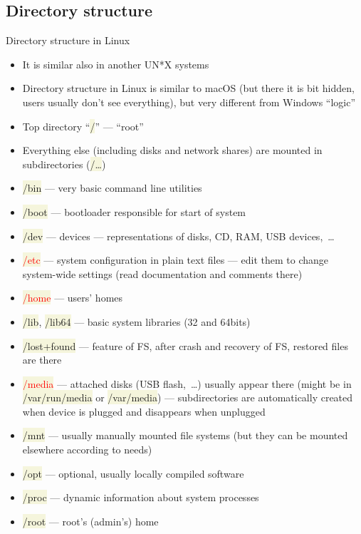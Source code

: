 \documentclass[compress, xelatex, 11pt, xcolor=svgnames, aspectratio=169,
	hyperref={
		bookmarks=true,
		unicode=true,
		colorlinks=true,
		pdftitle={Linux, command line and MetaCentrum},
		plainpages=false,
		pdfauthor={Vojtech Zeisek},
		pdfsubject={Course about use of Linux command line, writing shell scripts and using MetaCentrum of CESNET},
		pdfcreator={XeLaTeX},
		pdfkeywords={Linux, GNU, BASH, shell, command line, MetaCentrum},
		linkcolor=DarkRed, %
		anchorcolor=DarkBlue, %
		citecolor=Indigo, %
		filecolor=NavyBlue, %
		menucolor=DarkMagenta, %
		urlcolor=DarkBlue, %
		},
	url={hyphens, lowtilde} %
	]{beamer}
\renewcommand{\texttt}[1]{\colorbox{Beige}{{\ttfamily #1}}}
\renewcommand{\alert}[1]{\textcolor{red}{#1}}
\begin{document}
\subsection{Directory structure}

\begin{frame}[allowframebreaks]{Directory structure in Linux}
	\begin{itemize}
		\item It is similar also in another UN*X systems
		\item Directory structure in Linux is similar to macOS (but there it is bit hidden, users usually don't see everything), but very different from Windows \enquote{logic}
		\item Top directory \enquote{\texttt{/}} --- \enquote{root}
		\item Everything else (including disks and network shares) are mounted in subdirectories (\texttt{/\ldots})
		\item \texttt{/bin} --- very basic command line utilities
		\item \texttt{/boot} --- bootloader responsible for start of system
		\item \texttt{/dev} --- devices --- representations of disks, CD, RAM, USB devices,~\ldots
		\item \alert{\texttt{/etc}} --- system configuration in plain text files --- edit them to change system-wide settings (read documentation and comments there)
		\item \alert{\texttt{/home}} --- users' homes
		\item \texttt{/lib}, \texttt{/lib64} --- basic system libraries (32 and 64bits)
		\item \texttt{/lost+found} --- feature of FS, after crash and recovery of FS, restored files are there
		\item \alert{\texttt{/media}} --- attached disks (USB flash,~\ldots) usually appear there (might be in \texttt{/var/run/media} or  \texttt{/var/media}) --- subdirectories are automatically created when device is plugged and disappears when unplugged
		\item \texttt{/mnt} --- usually manually mounted file systems (but they can be mounted elsewhere according to needs)
		\item \texttt{/opt} --- optional, usually locally compiled software
		\item \texttt{/proc} --- dynamic information about system processes
		\item \texttt{/root} --- root's (admin's) home

\end{itemize}
\end{frame}
\end{document}
